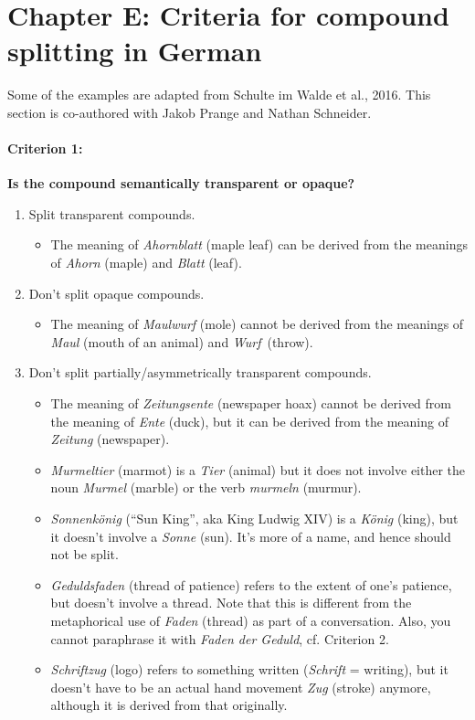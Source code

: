 \documentclass[11pt]{article}
\newcommand{\be}{\begin{enumerate}}
\newcommand{\ee}{\end{enumerate}}
\begin{document}
\section{Chapter E: Criteria for compound splitting in German}

Some of the examples are adapted from Schulte im Walde et al., 2016. This section is co-authored with Jakob Prange and Nathan Schneider.

\paragraph{Criterion 1:} {\bf Is the compound semantically transparent or opaque?}


\be
\item
Split transparent compounds. 
\begin{itemize}
\item
The meaning of {\it Ahornblatt} (maple leaf) can be derived from the meanings of {\it Ahorn} (maple) and {\it Blatt} (leaf).
\end{itemize}

\item
Don't split opaque compounds.
\begin{itemize}
\item
The meaning of {\it Maulwurf} (mole) 	cannot be derived from the meanings of {\it Maul} (mouth of an animal) and {\it Wurf}\, (throw).
\end{itemize}

\item
Don't split partially/asymmetrically transparent compounds.

\begin{itemize}
\item
The meaning of {\it Zeitungsente} (newspaper hoax) cannot be derived from the meaning of {\it Ente} (duck), but it can be derived from the meaning of {\it Zeitung} (newspaper).
\item
{\it Murmeltier} (marmot) is a {\it Tier} (animal) but it does not involve either the noun {\it Murmel} (marble) or the verb {\it murmeln} (murmur).
\item
{\it Sonnenk\"onig} (``Sun King'', aka King Ludwig XIV) is a {\it K\"{o}nig} (king), but it doesn't involve a {\it Sonne} (sun). It's more of a name, and hence should not be split.
\item
{\it Geduldsfaden} (thread of patience) refers to the extent of one's patience, but doesn't involve a thread. Note that this is different from the metaphorical use of {\it Faden} (thread) as part of a conversation. Also, you cannot paraphrase it with {\it Faden der Geduld}, cf. Criterion 2.
\item
{\it Schriftzug} (logo) refers to something written ({\it Schrift} = writing), but it doesn't have to be an actual hand movement {\it Zug} (stroke) anymore, although it is derived from that originally.
\end{itemize}
\ee
\end{document}
